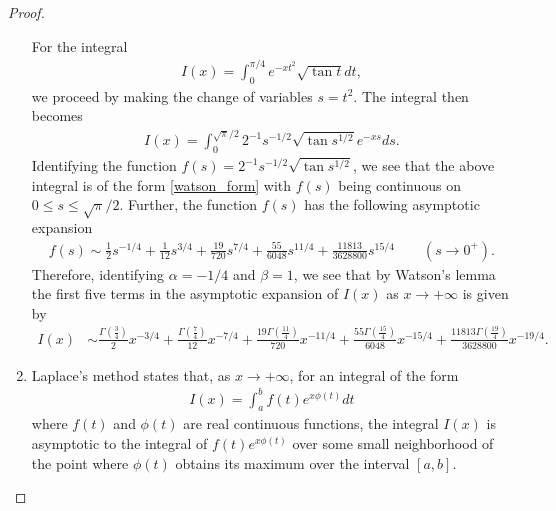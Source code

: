 \documentclass[12pt]{article}
\theoremstyle{definition}
\begin{document}
\begin{proof}
\begin{enumerate}
      For the integral
      \begin{align*}
        I(x) = \int_0^{\pi/4} e^{-xt^2} \sqrt{\tan t} dt,
      \end{align*}
      we proceed by making the change of variables $s = t^2$. The integral then becomes
      \begin{align*}
        I(x) = \int_0^{\sqrt{\pi}/2} 2^{-1}s^{-1/2}\sqrt{\tan s^{1/2}} e^{-xs}ds.
      \end{align*}
      Identifying the function $f(s) = 2^{-1}s^{-1/2}\sqrt{\tan s^{1/2}}$, we see that the above integral is of the form \eqref{watson_form}
      with $f(s)$ being continuous on $0 \leq s \leq \sqrt{\pi}/2$. Further, the function $f(s)$ has the following asymptotic
      expansion
      \begin{align*}
        f(s) \sim \frac{1}{2}s^{-1/4} + \frac{1}{12}s^{3/4} + \frac{19}{720}s^{7/4} + \frac{55}{6048} s^{11/4} + \frac{11813}{3628800}s^{15/4}  \qquad (s \to 0^+).
      \end{align*}
      Therefore, identifying $\alpha = -1/4$ and $\beta = 1$, we see that by Watson's lemma the first five terms in the asymptotic
      expansion of $I(x)$ as $x\to +\infty$ is given by
      \begin{align*}
        I(x) &\sim \frac{\Gamma\left(\frac{3}{4}\right)}{2}x^{-3/4} + \frac{\Gamma\left(\frac{7}{4}\right)}{12}x^{-7/4} + \frac{19\Gamma\left(\frac{11}{4}\right)}{720}x^{-11/4} + \frac{55\Gamma\left(\frac{15}{4}\right)}{6048} x^{-15/4}+ \frac{11813\Gamma\left(\frac{19}{4}\right)}{3628800}x^{-19/4}.
      \end{align*}

    \item Laplace's method states that, as $x\to +\infty$, for an integral of the form
      \begin{align*}
        I(x) = \int_a^b f(t)e^{x\phi(t)} dt
      \end{align*}
      where $f(t)$ and $\phi(t)$ are real continuous functions, the integral $I(x)$ is asymptotic to the integral of $f(t)e^{x\phi(t)}$ over some small
      neighborhood of the point where $\phi(t)$ obtains its maximum over the interval $[a, b]$.


\end{enumerate}
\end{proof}
\end{document}
